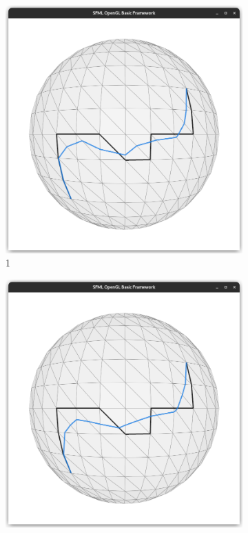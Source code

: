 \documentclass{stdlocal}
\begin{document}
\begin{figure}
  \centering
  \begin{subfigure}[b]{0.24\linewidth}
    \centering
    \includegraphics[width=\linewidth,trim={15px 20 15 50},clip]{images/sphere-geodesic-1-iteration-1.png}
    \caption{1}
  \end{subfigure}
  \begin{subfigure}[b]{0.24\linewidth}
    \centering
    \includegraphics[width=\linewidth,trim={15px 20 15 50},clip]{images/sphere-geodesic-1-iteration-2.png}

\end{subfigure}
\end{figure}
\end{document}
